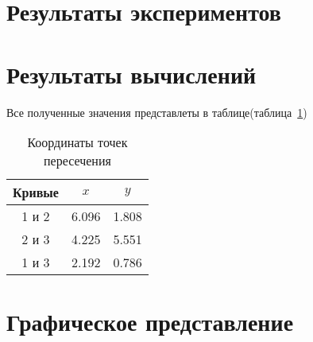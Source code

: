 \documentclass[a4paper,12pt,titlepage,finall]{article}
\begin{document}
\section{Результаты экспериментов}
\section{Результаты вычислений}
Все полученные значения представлеты в таблице(таблица~\ref{table1})

\begin{table}[h]
\centering
\begin{tabular}{|c|c|c|}
\hline
Кривые & $x$ & $y$ \\
\hline
1 и 2 & 6.096 & 1.808 \\
2 и 3 & 4.225 & 5.551\\
1 и 3 & 2.192 & 0.786 \\
\hline 
\end{tabular}
\caption{Координаты точек пересечения}
\label{table1}
\end{table}


\section{Графическое представление}
\end{document}
